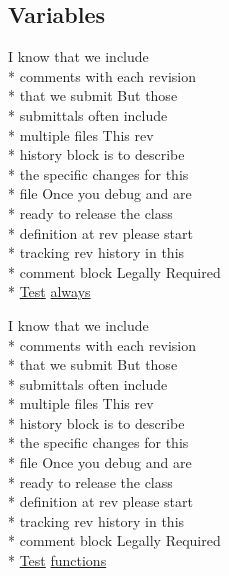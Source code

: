 \subsection*{Variables}
\begin{DoxyCompactItemize}
\item 
I know that we include \\*
comments with each revision \\*
that we submit But those \\*
submittals often include \\*
multiple files This rev \\*
history block is to describe \\*
the specific changes for this \\*
file Once you debug and are \\*
ready to release the class \\*
definition at rev please start \\*
tracking rev history in this \\*
comment block Legally Required \\*
\hyperlink{class_test}{Test} \hyperlink{header__comment_8dox_ae06201b642d2041bfbc9e4441241ae3e}{always}
\item 
I know that we include \\*
comments with each revision \\*
that we submit But those \\*
submittals often include \\*
multiple files This rev \\*
history block is to describe \\*
the specific changes for this \\*
file Once you debug and are \\*
ready to release the class \\*
definition at rev please start \\*
tracking rev history in this \\*
comment block Legally Required \\*
\hyperlink{class_test}{Test} \hyperlink{header__comment_8dox_a380ff23b583814c22c2de2b26c3b00d5}{functions}
\end{DoxyCompactItemize}


